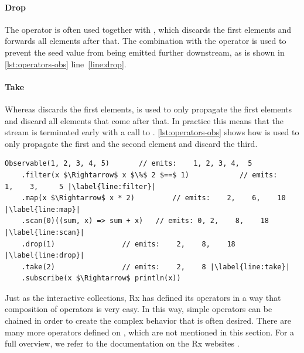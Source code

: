\paragraph{Drop}The  operator is often used together with , which discards the first  elements and forwards all elements after that. The combination with the  operator is used to prevent the seed value from being emitted further downstream, as is shown in \autoref{lst:operators-obs} line~\ref{line:drop}.

\paragraph{Take}Whereas  discards the first  elements,  is used to only propagate the first  elements and discard all elements that come after that. In practice this means that the stream is terminated early with a call to . \autoref{lst:operators-obs} shows how  is used to only propagate the first and the second element and discard the third.

\begin{minipage}{\linewidth}
\begin{lstlisting}[style=ScalaStyle, caption={Operators on \obs}, label={lst:operators-obs}, columns=fixed]
Observable(1, 2, 3, 4, 5)		// emits:    1, 2, 3, 4,  5
    .filter(x $\Rightarrow$ x $\%$ 2 $==$ 1)			// emits:    1,    3,     5 |\label{line:filter}|
    .map(x $\Rightarrow$ x * 2)			// emits:    2,    6,    10 |\label{line:map}|
    .scan(0)((sum, x) => sum + x)	// emits: 0, 2,    8,    18 |\label{line:scan}|
    .drop(1)				// emits:    2,    8,    18 |\label{line:drop}|
    .take(2)				// emits:    2,    8 |\label{line:take}|
    .subscribe(x $\Rightarrow$ println(x))
\end{lstlisting}
\end{minipage}

Just as the interactive collections, Rx has defined its operators in a way that composition of operators is very easy. In this way, simple operators can be chained in order to create the complex behavior that is often desired. There are many more operators defined on \obs, which are not mentioned in this section. For a full overview, we refer to the documentation on the Rx websites \cite{ReactiveX, rx-api, Rx.Net}.

